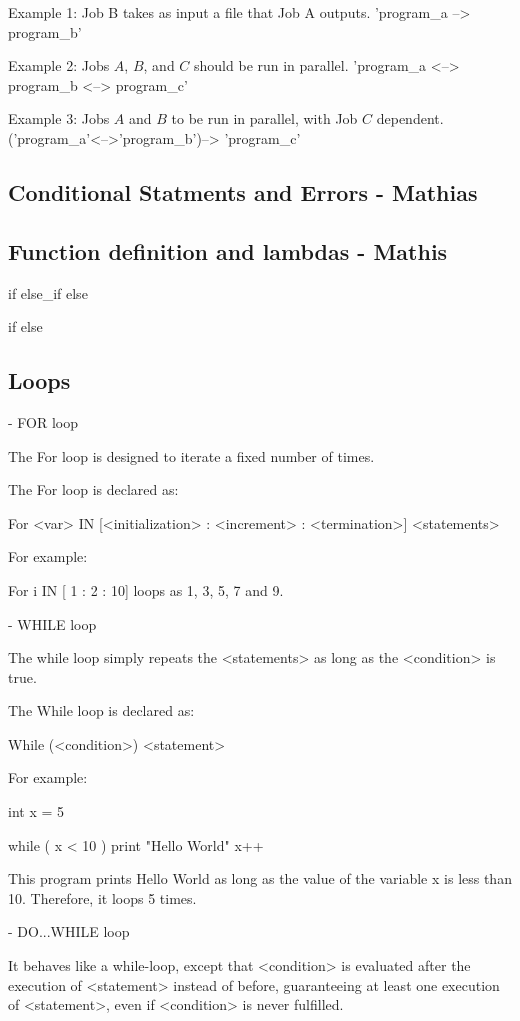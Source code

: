 \begin{enumerate}
Example 1:
Job B takes as input a file that Job A outputs. 'program_a --> program_b'

Example 2: 
Jobs $A$, $B$, and $C$ should be run in parallel. 'program_a <--> program_b <--> program_c'

Example 3:
Jobs $A$ and $B$ to be run in parallel, with Job $C$ dependent. ('program_a'<-->'program_b')--> 'program_c'
\subsection{Conditional Statments and Errors - Mathias}

\subsection{Function definition and lambdas - Mathis}

if {}
else\_if {}
else{}

if {}
else{}


\subsection{Loops}

- FOR loop

The For loop is designed to iterate a fixed number of times. 

The For loop is declared as:

For <var> IN [<initialization> : <increment> : <termination>]
{
     <statements>
}

For example:

For i IN [ 1 : 2 : 10] loops as 1, 3, 5, 7 and 9.


- WHILE loop

The while loop simply repeats the <statements> as long as the <condition> is true.

The While loop is declared as:

While (<condition>)
{
   <statement>
}

For example:

int x = 5

while ( x < 10 )
{
    print "Hello World"
    x++
}

This program prints Hello World as long as the value of the variable x is less than 10. Therefore, it loops 5 times.

- DO...WHILE loop

It behaves like a while-loop, except that <condition> is evaluated after the execution of <statement> instead of before, guaranteeing at least one execution of <statement>, even if <condition> is never fulfilled. 


\end{enumerate}
